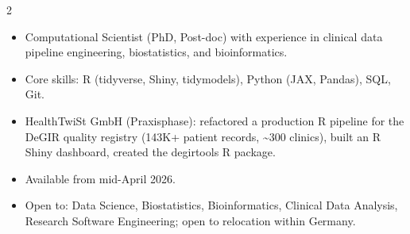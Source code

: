\documentclass{thejus_cv}
\begin{document}
\begin{paracol}{2}


\begin{itemize}[label=\textbullet, leftmargin=1em]
    \item Computational Scientist (PhD, Post-doc) with experience in clinical data pipeline engineering, biostatistics, and bioinformatics.
    \item Core skills: R (tidyverse, Shiny, tidymodels), Python (JAX, Pandas), SQL, Git.
    \item HealthTwiSt GmbH (Praxisphase): refactored a production R pipeline for the DeGIR quality registry (143K+ patient records, \textasciitilde300 clinics), built an R Shiny dashboard, created the degirtools R package.
    \item Available from mid-April 2026.
    \item Open to: Data Science, Biostatistics, Bioinformatics, Clinical Data Analysis, Research Software Engineering; open to relocation within Germany.
\end{itemize}



\end{paracol}
\end{document}
